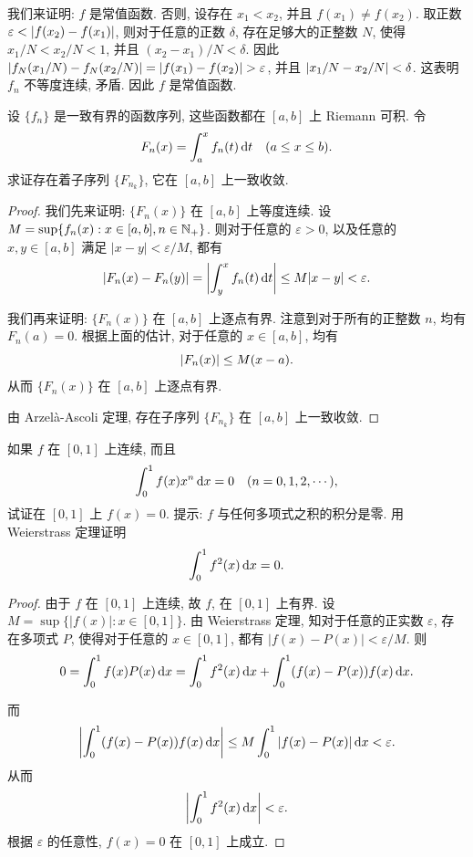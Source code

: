 \documentclass{article}
\begin{document}
\begin{solution}
  我们来证明: \( f \) 是常值函数. 否则, 设存在 \( x_1<x_2 \), 并且 \( f(x_1)\neq f(x_2) \). 取正数 \( \varepsilon < \left|f(x_2)-f(x_1)\right| \), 则对于任意的正数 \( \delta \), 存在足够大的正整数 \( N \), 使得 \( x_1/N<x_2/N<1 \), 并且 \( (x_2-x_1)/N<\delta \). 因此 \( \left|f_N(x_1/N)-f_N(x_2/N)\right| = \left|f(x_1)-f(x_2)\right| >\varepsilon \), 并且 \( \left|x_1/N-x_2/N\right|<\delta \). 这表明 \( f_n \) 不等度连续, 矛盾. 因此 \( f \) 是常值函数.
\end{solution}



\begin{problem}[7-18]
设 $\{f_n\}$ 是一致有界的函数序列, 这些函数都在 $[a, b]$ 上 Riemann 可积. 令
\[
F_n(x) = \int_a^x f_n(t) \,\mathrm{d} t \quad (a \le x \le b).
\]
求证存在着子序列 $\{F_{n_k}\}$, 它在 $[a, b]$ 上一致收敛.
\end{problem}

\begin{proof}
  我们先来证明: \( \{F_n(x)\}  \) 在 \( [a,b] \) 上等度连续. 设 \( M=\sup\{f_n(x):x\in[a,b], n\in\mathbb{N}_+\} \). 则对于任意的 \( \varepsilon>0 \), 以及任意的 \( x,y\in[a,b] \) 满足 \( |x-y|<\varepsilon/M \), 都有
  \[ |F_n(x)-F_n(y)| = \left| \int_y^x f_n(t) \,\mathrm{d} t \right| \le M|x-y| < \varepsilon. \]

  我们再来证明: \( \{F_n(x)\} \) 在 \( [a,b] \) 上逐点有界. 注意到对于所有的正整数 \( n \), 均有 \( F_n(a)=0 \). 根据上面的估计, 对于任意的 \( x\in[a,b] \), 均有
  \[ \left|F_n(x)\right|\le M(x-a). \]
  从而 \( \{F_n(x)\} \) 在 \( [a,b] \) 上逐点有界.

  由 Arzelà-Ascoli 定理, 存在子序列 \( \{F_{n_k}\} \) 在 \( [a,b] \) 上一致收敛.
\end{proof}



\begin{problem}[7-20]
如果 $f$ 在 $[0, 1]$ 上连续, 而且
\[
\int_0^1 f(x) x^n \,\mathrm{d} x = 0 \quad (n = 0, 1, 2, \cdots),
\]
试证在 $[0, 1]$ 上 $f(x) = 0$. 提示: $f$ 与任何多项式之积的积分是零. 用 Weierstrass 定理证明
\[
\int_0^1 f^2(x) \,\mathrm{d} x = 0.
\]
\end{problem}

\begin{proof}
  由于 \( f \) 在 \( [0,1] \) 上连续, 故 \( f \), 在 \( [0,1] \) 上有界. 设 \( M=\sup\{|f(x)|:x\in[0,1]\} \). 由 Weierstrass 定理, 知对于任意的正实数 \( \varepsilon \), 存在多项式 \( P \), 使得对于任意的 \( x\in[0,1] \), 都有 \( |f(x)-P(x)|<\varepsilon/M \). 则
  \[ 0= \int_0^1 f(x) P(x) \,\mathrm{d} x = \int_0^1 f^2(x) \,\mathrm{d} x + \int_0^1 (f(x)-P(x))f(x) \,\mathrm{d} x. \]

  而
  \[ \left|\int_{0}^{1} (f(x)-P(x))f(x) \,\mathrm{d} x\right| \le M \int_0^1 |f(x)-P(x)| \,\mathrm{d} x < \varepsilon. \]
  从而
  \[ \left|\int_0^1 f^2(x) \,\mathrm{d} x\right| < \varepsilon. \]
  根据 \( \varepsilon \) 的任意性, \( f(x) = 0 \) 在 \( [0,1] \) 上成立.
\end{proof}
\end{document}
